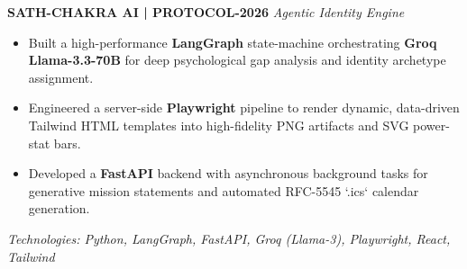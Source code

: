 \documentclass[a4paper,10pt]{article}
\begin{document}
\noindent\textbf{SATH-CHAKRA AI | PROTOCOL-2026} \hfill \textit{Agentic Identity Engine}
\begin{itemize}[leftmargin=*, topsep=4pt, itemsep=2pt]
    \item Built a high-performance \textbf{LangGraph} state-machine orchestrating \textbf{Groq Llama-3.3-70B} for deep psychological gap analysis and identity archetype assignment.
    \item Engineered a server-side \textbf{Playwright} pipeline to render dynamic, data-driven Tailwind HTML templates into high-fidelity PNG artifacts and SVG power-stat bars.
    \item Developed a \textbf{FastAPI} backend with asynchronous background tasks for generative mission statements and automated RFC-5545 `.ics` calendar generation.
\end{itemize}
\textit{Technologies: Python, LangGraph, FastAPI, Groq (Llama-3), Playwright, React, Tailwind}
\end{document}
